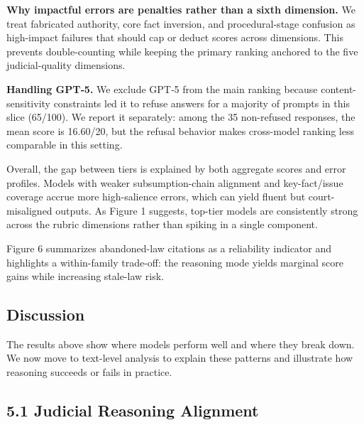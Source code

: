 \textbf{Why impactful errors are penalties rather than a sixth dimension.} We treat fabricated authority, core fact inversion, and procedural-stage confusion as high-impact failures that should cap or deduct scores across dimensions. This prevents double-counting while keeping the primary ranking anchored to the five judicial-quality dimensions.

\textbf{Handling GPT‑5.} We exclude GPT‑5 from the main ranking because content-sensitivity constraints led it to refuse answers for a majority of prompts in this slice (65/100). We report it separately: among the 35 non-refused responses, the mean score is 16.60/20, but the refusal behavior makes cross-model ranking less comparable in this setting.

Overall, the gap between tiers is explained by both aggregate scores and error profiles. Models with weaker subsumption-chain alignment and key-fact/issue coverage accrue more high-salience errors, which can yield fluent but court-misaligned outputs. As Figure 1 suggests, top-tier models are consistently strong across the rubric dimensions rather than spiking in a single component.

Figure 6 summarizes abandoned-law citations as a reliability indicator and highlights a within-family trade-off: the reasoning mode yields marginal score gains while increasing stale-law risk.

\hypertarget{discussion}{%
\subsection{\texorpdfstring{\textbf{Discussion}}{Discussion}}\label{discussion}}

The results above show where models perform well and where they break down.\\
We now move to text-level analysis to explain these patterns and illustrate how reasoning succeeds or fails in practice.

\hypertarget{judicial-reasoning-alignment}{%
\subsection{\texorpdfstring{\textbf{5.1 Judicial Reasoning Alignment}}{5.1 Judicial Reasoning Alignment}}\label{judicial-reasoning-alignment}}

